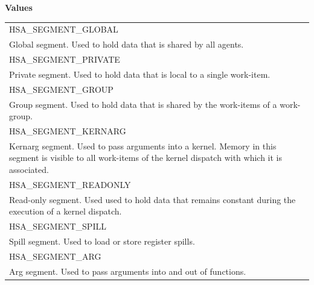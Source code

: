 \documentclass[final]{book}
\newcommand{\reftyp}[1]{#1}
\newcommand{\refenu}[1]{\reftyp{#1}}
\begin{document}
\noindent\textbf{Values}\\[-5mm]
\begin{longtable}{@{\hspace{2em}}p{\linewidth-2em}}
\hspace{-2em}\refenu{HSA_\-SEGMENT_\-GLOBAL}\\Global segment. Used to hold data that is shared by all agents.\\[2mm]
\hspace{-2em}\refenu{HSA_\-SEGMENT_\-PRIVATE}\\Private segment. Used to hold data that is local to a single work-item.\\[2mm]
\hspace{-2em}\refenu{HSA_\-SEGMENT_\-GROUP}\\Group segment. Used to hold data that is shared by the work-items of a work-group.\\[2mm]
\hspace{-2em}\refenu{HSA_\-SEGMENT_\-KERNARG}\\Kernarg segment. Used to pass arguments into a kernel. Memory in this segment is visible to all work-items of the kernel dispatch with which it is associated.\\[2mm]
\hspace{-2em}\refenu{HSA_\-SEGMENT_\-READONLY}\\Read-only segment. Used used to hold data that remains constant during the execution of a kernel dispatch.\\[2mm]
\hspace{-2em}\refenu{HSA_\-SEGMENT_\-SPILL}\\Spill segment. Used to load or store register spills.\\[2mm]
\hspace{-2em}\refenu{HSA_\-SEGMENT_\-ARG}\\Arg segment. Used to pass arguments into and out of functions.
\end{longtable}
\end{document}
